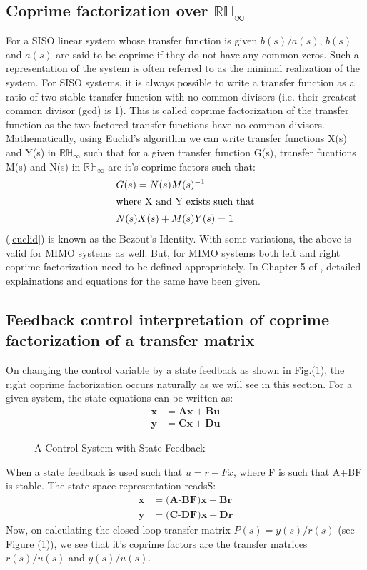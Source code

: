 \documentclass[a4paper,12pt]{article}
\begin{document}
	\subsection{Coprime factorization over $\mathbb{RH_{\infty}}$} For a SISO linear system whose transfer function is given $b(s)/a(s)$, $b(s)$ and $a(s)$ are said to be coprime if they do not have any common zeros. Such a representation of the system is often referred to as the minimal realization of the system. For SISO systems, it is always possible to write a transfer function as a ratio of two stable transfer function with no common divisors (i.e. their greatest common divisor (gcd) is 1). This is called coprime factorization of the transfer function as the two factored transfer functions have no common divisors. Mathematically, using Euclid's algorithm we can write transfer functions X(s) and Y(s) in $\mathbb{RH_{\infty}}$ such that for a given transfer function G(s), transfer fucntions M(s) and N(s) in $\mathbb{RH_{\infty}}$ are it's coprime factors such that:
	\begin{align}
		&G(s) = N(s)M(s)^{-1}\\
		\intertext{where X and Y exists such that}
		&N(s)X(s)+M(s)Y(s)=1
		\label{euclid}
	\end{align}
	(\ref{euclid}) is known as the Bezout's Identity. With some variations, the above is valid for MIMO systems as well. But, for MIMO systems both left and right coprime factorization need to be defined appropriately. In Chapter 5 of \cite{book}, detailed explainations and equations for the same have been given.
		\subsection{Feedback control interpretation of coprime factorization of a transfer matrix}On changing the control variable by a state feedback as shown in Fig.(\ref{sf}), the right coprime factorization occurs naturally as we will see in this section. For a given system, the state equations can be written as:
		\begin{align}
		\textbf{\.x}&=\textbf{Ax} + \textbf{Bu}\\
		\textbf{y}&=\textbf{Cx} + \textbf{Du}
		\end{align}
		\begin{figure}[H]
 
			  \centering
			  
%			  
			  \def\svgscale{1.8}
			  \tiny{
			  
			  }
			  \caption{A Control System with State Feedback}
			 \label{sf}
		\end{figure}
		When a state feedback is used such that $u=r-Fx$, where F is such that A+BF is stable. The state space representation readsS:
		\begin{align}
		\textbf{\.x}&=\textbf{(A-BF)x} + \textbf{Br}\\
		\textbf{y}&=\textbf{(C-DF)x} + \textbf{Dr}
		\end{align}		
		Now, on calculating the closed loop transfer matrix $P(s)=y(s)/r(s)$ (see Figure (\ref{sf})), we see that it's coprime factors are the transfer matrices $r(s)/u(s)$ and $y(s)/u(s)$.
\end{document}
